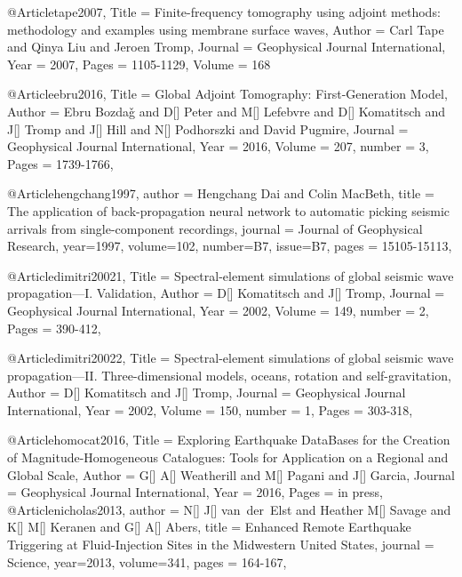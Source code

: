 @Article{tape2007,
  Title                    = {Finite-frequency tomography using adjoint methods: methodology and examples using membrane surface waves},
  Author                   = {Carl Tape and Qinya Liu and Jeroen Tromp},
  Journal                  = Geophysical Journal International,
  Year                     = {2007},
  Pages                    = {1105-1129},
  Volume                   = {168}
}

@Article{ebru2016,
  Title                    = {Global Adjoint Tomography: First-Generation Model},
  Author                   = {Ebru Bozda\v{g} and D[] Peter and M[] Lefebvre and D[] Komatitsch and J[] Tromp and J[] Hill and N[] Podhorszki and David Pugmire},
  Journal                  = Geophysical Journal International,
  Year                     = {2016},
  Volume                   = {207},
  number                   = {3},
  Pages                    = {1739-1766},
}

@Article{hengchang1997,
  author =	 {Hengchang Dai and Colin MacBeth},
  title =	 {The application of back-propagation neural network to automatic picking seismic arrivals from single-component recordings},
  journal =	 {Journal of Geophysical Research},
  year=1997,
  volume=102,
  number=B7,
  issue=B7,
  pages =	 {15105-15113},
}


@Article{dimitri20021,
  Title                    = {Spectral-element simulations of global seismic wave propagation—I. Validation},
  Author                   = {D[] Komatitsch and J[] Tromp},
  Journal                  = Geophysical Journal International,
  Year                     = {2002},
  Volume                   = {149},
  number                   = {2},
  Pages                    = {390-412},
}

@Article{dimitri20022,
  Title                    = {Spectral-element simulations of global seismic wave propagation—II. Three-dimensional models, oceans, rotation and self-gravitation},
  Author                   = {D[] Komatitsch and J[] Tromp},
  Journal                  = Geophysical Journal International,
  Year                     = {2002},
  Volume                   = {150},
  number                   = {1},
  Pages                    = {303-318},
}



@Article{homocat2016,
  Title                    = {Exploring Earthquake DataBases for the Creation of Magnitude-Homogeneous Catalogues: Tools for Application on a Regional and Global Scale},
  Author                   = {G[] A[] Weatherill and M[] Pagani and J[] Garcia},
  Journal                  = {Geophysical Journal International},
  Year                     = {2016},
  Pages                    = {in press},
}
@Article{nicholas2013,
  author =	 {N[] J[] van~der~Elst and Heather M[] Savage and K[] M[] Keranen and G[] A[] Abers},
  title =	 {Enhanced Remote Earthquake Triggering at Fluid-Injection Sites in the Midwestern United States},
  journal =	 {Science},
  year=2013,
  volume=341,
  pages =	 {164-167},
}

